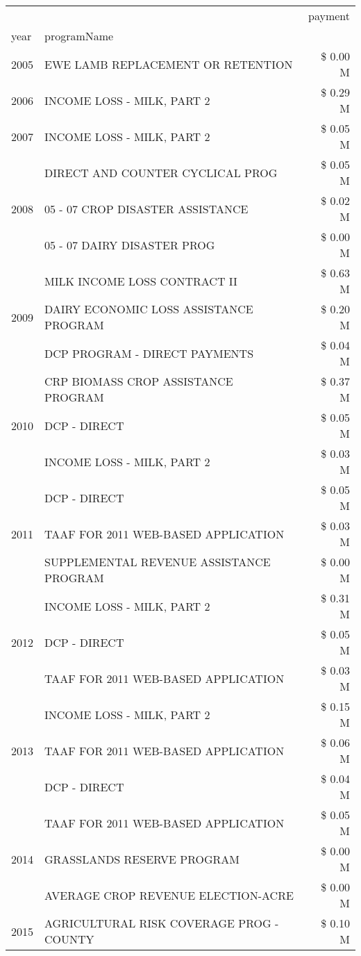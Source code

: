 \begin{tabular}{llr}
\toprule
 &  & payment \\
year & programName &  \\
\midrule
2005 & EWE LAMB REPLACEMENT OR RETENTION & \$ 0.00 M \\
\cline{1-3}
2006 & INCOME LOSS - MILK, PART 2 & \$ 0.29 M \\
\cline{1-3}
2007 & INCOME LOSS - MILK, PART 2 & \$ 0.05 M \\
\cline{1-3}
\multirow[t]{3}{*}{2008} & DIRECT AND COUNTER CYCLICAL PROG & \$ 0.05 M \\
 & 05 - 07 CROP DISASTER ASSISTANCE & \$ 0.02 M \\
 & 05 - 07 DAIRY DISASTER PROG & \$ 0.00 M \\
\cline{1-3}
\multirow[t]{3}{*}{2009} & MILK INCOME LOSS CONTRACT II & \$ 0.63 M \\
 & DAIRY ECONOMIC LOSS ASSISTANCE PROGRAM & \$ 0.20 M \\
 & DCP PROGRAM - DIRECT PAYMENTS & \$ 0.04 M \\
\cline{1-3}
\multirow[t]{3}{*}{2010} & CRP BIOMASS CROP ASSISTANCE PROGRAM & \$ 0.37 M \\
 & DCP - DIRECT & \$ 0.05 M \\
 & INCOME LOSS - MILK, PART 2 & \$ 0.03 M \\
\cline{1-3}
\multirow[t]{3}{*}{2011} & DCP - DIRECT & \$ 0.05 M \\
 & TAAF FOR 2011 WEB-BASED APPLICATION & \$ 0.03 M \\
 & SUPPLEMENTAL REVENUE ASSISTANCE PROGRAM & \$ 0.00 M \\
\cline{1-3}
\multirow[t]{3}{*}{2012} & INCOME LOSS - MILK, PART 2 & \$ 0.31 M \\
 & DCP - DIRECT & \$ 0.05 M \\
 & TAAF FOR 2011 WEB-BASED APPLICATION & \$ 0.03 M \\
\cline{1-3}
\multirow[t]{3}{*}{2013} & INCOME LOSS - MILK, PART 2 & \$ 0.15 M \\
 & TAAF FOR 2011 WEB-BASED APPLICATION & \$ 0.06 M \\
 & DCP - DIRECT & \$ 0.04 M \\
\cline{1-3}
\multirow[t]{3}{*}{2014} & TAAF FOR 2011 WEB-BASED APPLICATION & \$ 0.05 M \\
 & GRASSLANDS RESERVE PROGRAM & \$ 0.00 M \\
 & AVERAGE CROP REVENUE ELECTION-ACRE & \$ 0.00 M \\
\cline{1-3}
\multirow[t]{2}{*}{2015} & AGRICULTURAL RISK COVERAGE PROG - COUNTY & \$ 0.10 M \\

\end{tabular}
